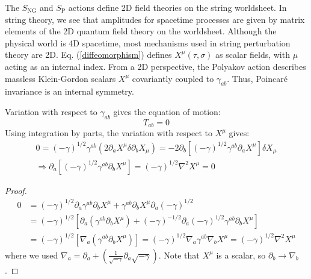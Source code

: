 The $S_{\mathrm{NG}}$ and $S_{\mathrm{P}}$ actions define 2D field theories on the string worldsheet. In string theory, we see that amplitudes for spacetime processes are given by matrix elements of the 2D quantum field theory on the worldsheet. 
Although the physical world is 4D spacetime, most mechanisms used in string perturbation theory are 2D. Eq. (\ref{diffeomorphism}) defines $X^\mu(\tau, \sigma)$ as scalar fields, with $\mu$ acting as an internal index. From a 2D perspective, the Polyakov action describes massless Klein-Gordon scalars $X^\mu$ covariantly coupled to $\gamma_{ab}$. Thus, Poincaré invariance is an internal symmetry. 

Variation with respect to $\gamma_{ab}$ gives the equation of motion: 
\begin{equation}\label{vanish:Tab}
	T_{ab}=0
\end{equation}
Using integration by parts, the variation with respect to $X^\mu$ gives: 
\begin{gather}
	0=(-\gamma)^{1/2}\gamma^{ab}(2\partial_a X^\mu\delta\partial_b X_\mu)
	=-2\partial_b[(-\gamma)^{1/2}\gamma^{ab}\partial_a X^\mu]\delta X_\mu \nonumber \\
	\Longrightarrow\partial_a[(-\gamma)^{1/2}\gamma^{ab}\partial_b X^\mu]=(-\gamma)^{1/2}\nabla^2 X^\mu=0
\end{gather}
\begin{tcolorbox}[breakable]
	\begin{proof}
		\begin{align}
			0&=(-\gamma)^{1/2}\partial_a \gamma^{ab}\partial_b X^\mu +\gamma^{ab}\partial_b X^\mu \partial_a(-\gamma)^{1/2} \nonumber \\
			&=(-\gamma)^{1/2}[\partial_a (\gamma^{ab}\partial_b X^\mu )+(-\gamma)^{-1/2}\partial_a(-\gamma)^{1/2}\gamma^{ab}\partial_b X^\mu ] \nonumber \\
			&=(-\gamma)^{1/2}[\nabla_a (\gamma^{ab}\partial_b X^\mu )]=(-\gamma)^{1/2}\nabla_a \gamma^{ab}\nabla_b X^\mu =(-\gamma)^{1/2}\nabla^2 X^\mu \nonumber
		\end{align} 
		where we used $\nabla_a=\partial_a+(\frac{1}{\sqrt{-\gamma}}\partial_a\sqrt{-\gamma})$.
		Note that $X^\mu$ is a scalar, so $\partial_b\rightarrow \nabla_b$.
	\end{proof} 
\end{tcolorbox} 

